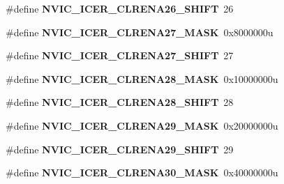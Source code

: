 \begin{DoxyCompactItemize}
\item 
\mbox{\label{group___n_v_i_c___register___masks_ga881a2bb46981a4b1417da75dc138cc3c}} 
\#define {\bfseries N\+V\+I\+C\+\_\+\+I\+C\+E\+R\+\_\+\+C\+L\+R\+E\+N\+A26\+\_\+\+S\+H\+I\+FT}~26
\item 
\mbox{\label{group___n_v_i_c___register___masks_ga7d5a8587d423b64c21161e7a35bb4acc}} 
\#define {\bfseries N\+V\+I\+C\+\_\+\+I\+C\+E\+R\+\_\+\+C\+L\+R\+E\+N\+A27\+\_\+\+M\+A\+SK}~0x8000000u
\item 
\mbox{\label{group___n_v_i_c___register___masks_gae129ab240184fd187397a4d5f91aac6e}} 
\#define {\bfseries N\+V\+I\+C\+\_\+\+I\+C\+E\+R\+\_\+\+C\+L\+R\+E\+N\+A27\+\_\+\+S\+H\+I\+FT}~27
\item 
\mbox{\label{group___n_v_i_c___register___masks_gae441a57bb6a91d1ec804e2a4ab28822d}} 
\#define {\bfseries N\+V\+I\+C\+\_\+\+I\+C\+E\+R\+\_\+\+C\+L\+R\+E\+N\+A28\+\_\+\+M\+A\+SK}~0x10000000u
\item 
\mbox{\label{group___n_v_i_c___register___masks_ga21f3ee0cd46d40bb371984596b48a435}} 
\#define {\bfseries N\+V\+I\+C\+\_\+\+I\+C\+E\+R\+\_\+\+C\+L\+R\+E\+N\+A28\+\_\+\+S\+H\+I\+FT}~28
\item 
\mbox{\label{group___n_v_i_c___register___masks_ga60295fcb165685670d0e5d54a4499a1e}} 
\#define {\bfseries N\+V\+I\+C\+\_\+\+I\+C\+E\+R\+\_\+\+C\+L\+R\+E\+N\+A29\+\_\+\+M\+A\+SK}~0x20000000u
\item 
\mbox{\label{group___n_v_i_c___register___masks_ga1e7f618229c33dc5ed6a23903f98fbba}} 
\#define {\bfseries N\+V\+I\+C\+\_\+\+I\+C\+E\+R\+\_\+\+C\+L\+R\+E\+N\+A29\+\_\+\+S\+H\+I\+FT}~29
\item 
\mbox{\label{group___n_v_i_c___register___masks_ga6ff4fef5029adcc745122ded3c95eff8}} 
\#define {\bfseries N\+V\+I\+C\+\_\+\+I\+C\+E\+R\+\_\+\+C\+L\+R\+E\+N\+A30\+\_\+\+M\+A\+SK}~0x40000000u
\item 
\mbox{\label{group___n_v_i_c___register___masks_gabf7b6b13759d416fdff715d6bb7aeac7}} 

\end{DoxyCompactItemize}
